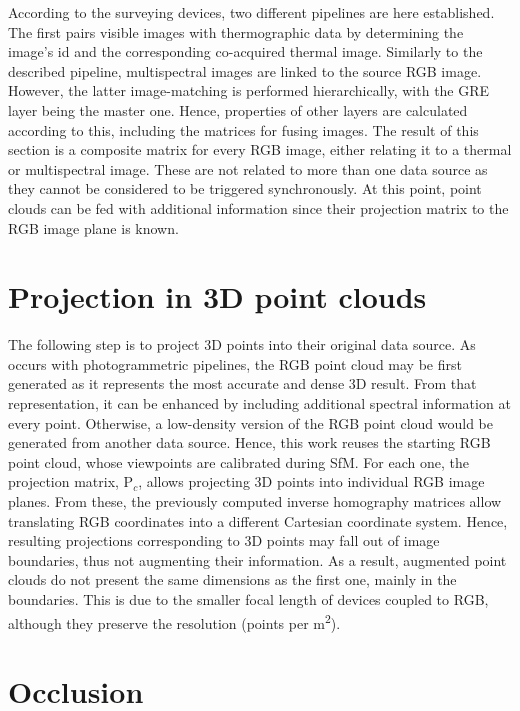 According to the surveying devices, two different pipelines are here established. The first pairs visible images with thermographic data by determining the image's id and the corresponding co-acquired thermal image. Similarly to the described pipeline, multispectral images are linked to the source RGB image. However, the latter image-matching is performed hierarchically, with the GRE layer being the master one. Hence, properties of other layers are calculated according to this, including the matrices for fusing images. The result of this section is a composite matrix for every RGB image, either relating it to a thermal or multispectral image. These are not related to more than one data source as they cannot be considered to be triggered synchronously. At this point, point clouds can be fed with additional information since their projection matrix to the RGB image plane is known. 

\section{Projection in 3D point clouds}

The following step is to project 3D points into their original data source. As occurs with photogrammetric pipelines, the RGB point cloud may be first generated as it represents the most accurate and dense 3D result. From that representation, it can be enhanced by including additional spectral information at every point. Otherwise, a low-density version of the RGB point cloud would be generated from another data source. Hence, this work reuses the starting RGB point cloud, whose viewpoints are calibrated during SfM. For each one, the projection matrix, P$_c$, allows projecting 3D points into individual RGB image planes. From these, the previously computed inverse homography matrices allow translating RGB coordinates into a different Cartesian coordinate system. Hence, resulting projections corresponding to 3D points may fall out of image boundaries, thus not augmenting their information. As a result, augmented point clouds do not present the same dimensions as the first one, mainly in the boundaries. This is due to the smaller focal length of devices coupled to RGB, although they preserve the resolution (points per \si{\meter\squared}).

\section{Occlusion}

